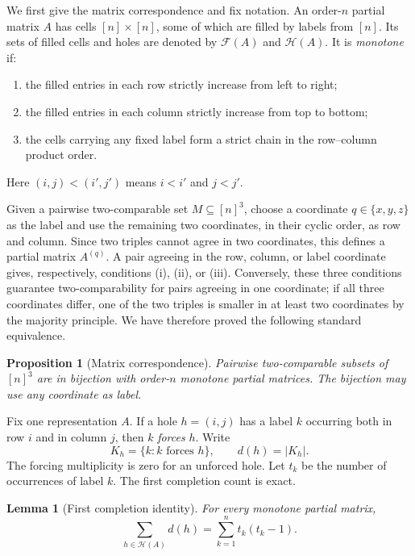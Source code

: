 \documentclass[11pt]{article}
\numberwithin{equation}{section}
\newtheorem{lemma}[theorem]{Lemma}
\newtheorem{proposition}[theorem]{Proposition}
\theoremstyle{definition}
\theoremstyle{remark}
\newcommand{\Fcal}{\mathcal F}
\newcommand{\Hcal}{\mathcal H}
\begin{document}
We first give the matrix correspondence and fix notation.  An order-$n$
partial matrix $A$ has cells $[n]\times[n]$, some of which are filled by
labels from $[n]$.  Its sets of filled cells and holes are denoted by
$\Fcal(A)$ and $\Hcal(A)$.  It is \emph{monotone} if:
\begin{enumerate}[label=(\roman*)]
\item the filled entries in each row strictly increase from left to right;
\item the filled entries in each column strictly increase from top to bottom;
\item the cells carrying any fixed label form a strict chain in the
row--column product order.
\end{enumerate}
Here $(i,j)<(i',j')$ means $i<i'$ and $j<j'$.

Given a pairwise two-comparable set $M\subseteq[n]^3$, choose a coordinate
$q\in\{x,y,z\}$ as the label and use the remaining two coordinates, in their
cyclic order, as row and column.  Since two triples cannot agree in two
coordinates, this defines a partial matrix $A^{(q)}$.  A pair agreeing in the
row, column, or label coordinate gives, respectively, conditions (i), (ii), or
(iii).  Conversely, these three conditions guarantee two-comparability for
pairs agreeing in one coordinate; if all three coordinates differ, one of the
two triples is smaller in at least two coordinates by the majority principle.
We have therefore proved the following standard equivalence.

\begin{proposition}[Matrix correspondence]\label{prop:matrix-correspondence}
Pairwise two-comparable subsets of $[n]^3$ are in bijection with order-$n$
monotone partial matrices.  The bijection may use any coordinate as label.
\end{proposition}

Fix one representation $A$.  If a hole $h=(i,j)$ has a label $k$ occurring
both in row $i$ and in column $j$, then $k$ \emph{forces} $h$.  Write
\[
 K_h=\{k:k\text{ forces }h\},\qquad d(h)=|K_h|.
\]
The forcing multiplicity is zero for an unforced hole.  Let $t_k$ be the
number of occurrences of label $k$.  The first completion count is exact.

\begin{lemma}[First completion identity]\label{lem:first-completion}
For every monotone partial matrix,
\begin{equation}\label{eq:first-completion}
 \sum_{h\in\Hcal(A)}d(h)=\sum_{k=1}^n t_k(t_k-1).
\end{equation}
\end{lemma}
\end{document}

